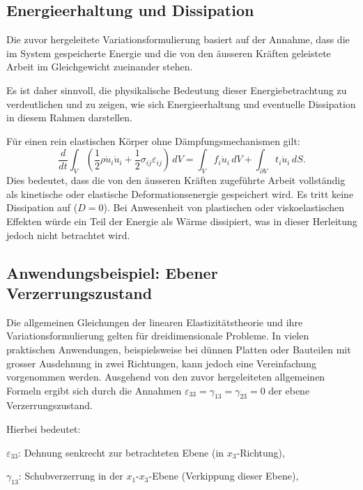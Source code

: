 \subsection{Energieerhaltung und Dissipation}
Die zuvor hergeleitete Variationsformulierung basiert auf der
Annahme, dass die im System gespeicherte Energie und die von den
äusseren Kräften geleistete Arbeit im Gleichgewicht zueinander
stehen.

Es ist daher sinnvoll, die physikalische Bedeutung dieser
Energiebetrachtung zu verdeutlichen und zu zeigen, wie sich
Energieerhaltung und eventuelle Dissipation in diesem Rahmen
%
%
darstellen.

Für einen rein elastischen Körper ohne Dämpfungsmechanismen gilt:
%
\begin{equation*}
	\frac{d}{dt} \int_V \left( \frac{1}{2} \rho \dot{u}_i \dot{u}_i + \frac{1}{2} \sigma_{ij} \varepsilon_{ij} \right) \, dV = 
	\int_V f_i \dot{u}_i \, dV + \int_{\partial V} t_i \dot{u}_i \, dS.
\end{equation*}
Dies bedeutet, dass die von den äusseren Kräften zugeführte Arbeit
vollständig als kinetische oder elastische Deformationsenergie
gespeichert wird.
Es tritt keine Dissipation auf ($D=0$). 
Bei Anwesenheit von plastischen oder viskoelastischen Effekten würde
%
ein Teil der Energie als Wärme dissipiert, was in dieser Herleitung
jedoch nicht betrachtet wird.

\subsection{Anwendungsbeispiel: Ebener Verzerrungszustand}
Die allgemeinen Gleichungen der linearen Elastizitätstheorie und
ihre Variationsformulierung gelten für dreidimensionale Probleme.
In vielen praktischen Anwendungen, beispielsweise bei dünnen Platten
%
oder Bauteilen mit grosser Ausdehnung in zwei Richtungen, kann
jedoch eine Vereinfachung vorgenommen werden.
Ausgehend von den zuvor hergeleiteten allgemeinen Formeln ergibt
sich durch die Annahmen  \(\varepsilon_{33} = \gamma_{13} = \gamma_{23}
= 0\) der ebene Verzerrungszustand.

Hierbei bedeutet:

$\varepsilon_{33}$: Dehnung senkrecht zur betrachteten Ebene (in $x_3$-Richtung),

$\gamma_{13}$: Schubverzerrung in der $x_1$-$x_3$-Ebene (Verkippung dieser Ebene),

